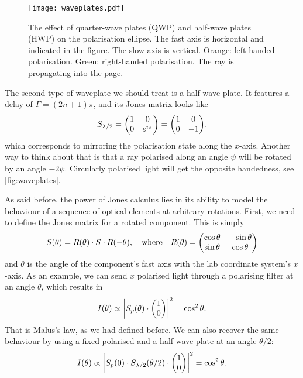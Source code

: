 \begin{figure}
	\centering
	\texttt{[image: waveplates.pdf]}
	\caption{
		The effect of quarter-wave plates (QWP) and half-wave plates (HWP) on the polarisation ellipse. The fast axis is horizontal and indicated in the figure. The slow axis is vertical. Orange: left-handed polarisation. Green: right-handed polarisation. The ray is propagating into the page.
	}
	\label{fig:waveplates}
\end{figure}

The second type of waveplate we should treat is a half-wave plate. It features a delay of $ \Gamma = (2n+1)\pi $, and its Jones matrix looks like
\begin{equation}
	S_\hwp = \mqty(1 & 0 \\ 0 & e^{i\pi}) = \mqty(1 & 0 \\ 0 & -1).
\end{equation}
which corresponds to mirroring the polarisation state along the $ x $-axis. Another way to think about that is that a ray polarised along an angle $ \psi $ will be rotated by an angle $ -2\psi $. Circularly polarised light will get the opposite handedness, see \autoref{fig:waveplates}.

As said before, the power of Jones calculus lies in its ability to model the behaviour of a sequence of optical elements at arbitrary rotations. First, we need to define the Jones matrix for a rotated component. This is simply
\begin{equation}
	S(\theta) = R(\theta) \cdot S \cdot R(-\theta),
	\qq{where} 
	R(\theta) = \mqty(\cos\theta & -\sin\theta \\ \sin\theta & \cos\theta)
\end{equation}
and $ \theta $ is the angle of the component's fast axis with the lab coordinate system's $ x $-axis. As an example, we can send $ x $ polarised light through a polarising filter at an angle $ \theta $, which results in
\begin{equation}
	I(\theta) \propto \abs{S_p(\theta) \cdot \mqty(1 \\ 0)}^2 = \cos^2\theta.
\end{equation}
That is Malus's law, as we had defined before. We can also recover the same behaviour by using a fixed polarised and a half-wave plate at an angle $ \theta/2 $:
\begin{equation}
	I(\theta) \propto \abs{S_p(0) \cdot S_\hwp(\theta/2) \cdot \mqty(\admat{1 \\ 0})}^2 = \cos^2\theta.
\end{equation}

